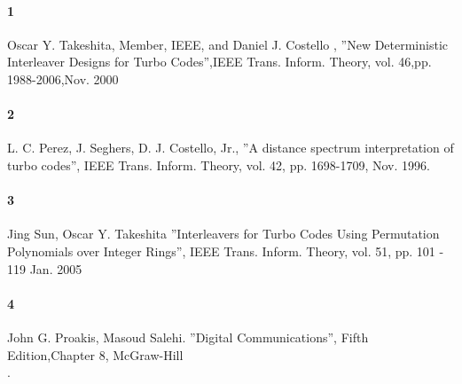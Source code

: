 \documentclass[20 pts]{article}
\begin{document}
\paragraph{1}  Oscar Y. Takeshita, Member, IEEE, and Daniel J. Costello ,
''New Deterministic Interleaver Designs for Turbo Codes'',IEEE Trans. Inform. Theory,
 vol. 46,pp. 1988-2006,Nov. 2000\\
  \paragraph{2} L. C. Perez, J. Seghers, D. J. Costello, Jr., 
  ''A distance spectrum interpretation of turbo codes'', IEEE Trans. Inform. Theory,
   vol. 42, pp. 1698-1709, Nov. 1996.\\
\paragraph{3} Jing Sun, Oscar Y. Takeshita ”Interleavers for Turbo Codes Using 
Permutation Polynomials over Integer Rings”, IEEE Trans. Inform. Theory, vol. 51,
pp. 101 - 119 Jan. 2005\\
\paragraph{4} John G. Proakis, Masoud Salehi. ''Digital Communications'', 
Fifth Edition,Chapter 8, McGraw-Hill\\.
\end{document}
